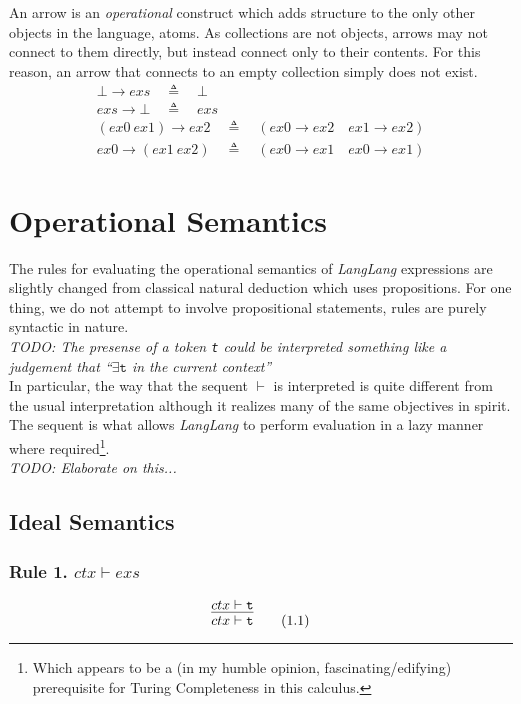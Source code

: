 \documentclass[a4paper,11pt]{article}
\begin{document}
An arrow is an \emph{operational} construct which adds structure to the only other objects in the language, atoms.
As collections are not objects, arrows may not connect to them directly, but instead connect only to their contents.
For this reason, an arrow that connects to an empty collection simply does not exist.
\begin{eqnarray}
\bot \rightarrow exs \quad\triangleq\quad \bot \\
exs \rightarrow \bot \quad\triangleq\quad exs \\
(ex0\ ex1) \rightarrow ex2 \quad\triangleq\quad (ex0 \rightarrow ex2 \quad ex1 \rightarrow ex2) \\
ex0 \rightarrow (ex1\ ex2) \quad\triangleq\quad (ex0 \rightarrow ex1 \quad ex0 \rightarrow ex1)
\end{eqnarray}

\section{Operational Semantics}
The rules for evaluating the operational semantics of \textsl{LangLang} expressions are slightly changed from classical natural deduction which uses propositions.
For one thing, we do not attempt to involve propositional statements, rules are purely syntactic in nature.\\
\emph{TODO: The presense of a token \texttt{t} could be interpreted something like a judgement that ``$\exists\texttt{t}$ in the current context''}\\

In particular, the way that the sequent $\vdash$ is interpreted is quite different from the usual interpretation although it realizes many of the same objectives in spirit.
The sequent is what allows \textsl{LangLang} to perform evaluation in a lazy manner where required\footnote{Which appears to be a (in my humble opinion, fascinating/edifying) prerequisite for Turing Completeness in this calculus.}.\\
\emph{TODO: Elaborate on this...}

\subsection{Ideal Semantics}
\subsubsection{Rule 1. $ctx \vdash exs$ }
\begin{equation}
\infer{ctx \vdash \texttt{t}}{ctx \vdash \texttt{t}} \tag{1.1}
\end{equation}
\end{document}
